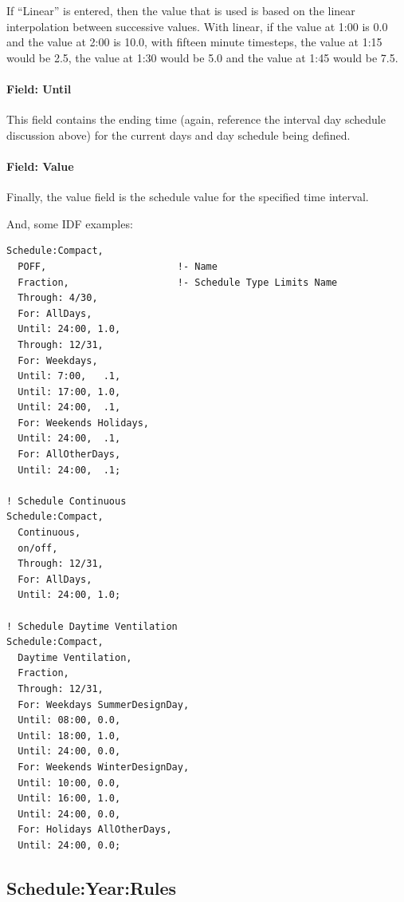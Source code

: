 If ``Linear'' is entered, then the value that is used is based on the linear interpolation between successive values. With linear, if the value at 1:00 is 0.0 and the value at 2:00 is 10.0, with fifteen minute timesteps, the value at 1:15 would be 2.5, the value at 1:30 would be 5.0 and the value at 1:45 would be 7.5.

\paragraph{Field: Until}\label{field-until}

This field contains the ending time (again, reference the interval day schedule discussion above) for the current days and day schedule being defined.

\paragraph{Field: Value}\label{field-value-1}

Finally, the value field is the schedule value for the specified time interval.

And, some IDF examples:

\begin{lstlisting}
Schedule:Compact,
  POFF,                       !- Name
  Fraction,                   !- Schedule Type Limits Name
  Through: 4/30,
  For: AllDays,
  Until: 24:00, 1.0,
  Through: 12/31,
  For: Weekdays,
  Until: 7:00,   .1,
  Until: 17:00, 1.0,
  Until: 24:00,  .1,
  For: Weekends Holidays,
  Until: 24:00,  .1,
  For: AllOtherDays,
  Until: 24:00,  .1;

! Schedule Continuous
Schedule:Compact,
  Continuous,
  on/off,
  Through: 12/31,
  For: AllDays,
  Until: 24:00, 1.0;

! Schedule Daytime Ventilation
Schedule:Compact,
  Daytime Ventilation,
  Fraction,
  Through: 12/31,
  For: Weekdays SummerDesignDay,
  Until: 08:00, 0.0,
  Until: 18:00, 1.0,
  Until: 24:00, 0.0,
  For: Weekends WinterDesignDay,
  Until: 10:00, 0.0,
  Until: 16:00, 1.0,
  Until: 24:00, 0.0,
  For: Holidays AllOtherDays,
  Until: 24:00, 0.0;
\end{lstlisting}

\subsection{Schedule:Year:Rules}\label{scheduleyearrules}

